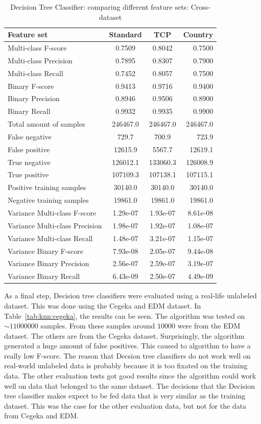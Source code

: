 \begin{table}[H]
\caption{Decision Tree Classifier: comparing different feature sets: Cross-dataset}
\label{tab:tree:cross}
\centering
\begin{tabular}{l c c r}
\toprule
Feature set & Standard & TCP & Country \\
\midrule
Multi-class F-score & 0.7509 & 0.8042 & 0.7500 \\
Multi-class Precision & 0.7895 & 0.8307 & 0.7900 \\
Multi-class Recall & 0.7452 & 0.8057 & 0.7500 \\
\midrule
Binary F-score & 0.9413 & 0.9716 & 0.9400 \\
Binary Precision & 0.8946 & 0.9506 & 0.8900 \\
Binary Recall & 0.9932 & 0.9935 & 0.9900 \\
\midrule
Total amount of samples & 246467.0 & 246467.0 & 246467.0 \\
False negative & 729.7  &  700.9 & 723.9 \\
False positive & 12615.9 & 5567.7 & 12619.1 \\
True negative & 126012.1 &  133060.3 & 126008.9  \\
True positive & 107109.3 & 107138.1 & 107115.1 \\
\midrule
Positive training samples & 30140.0 & 30140.0 & 30140.0\\
Negative training samples & 19861.0 & 19861.0 & 19861.0\\
\midrule
Variance Multi-class F-score & 1.29e-07 & 1.93e-07 & 8.61e-08 \\
Variance Multi-class Precision & 1.98e-07  &  1.92e-07  &  1.08e-07 \\
Variance Multi-class Recall &  1.48e-07 &  3.21e-07 &  1.15e-07  \\
\midrule
Variance Binary F-score & 7.93e-08  & 2.05e-07 & 9.44e-08   \\
Variance Binary Precision & 2.56e-07  &  2.59e-07  & 3.19e-07    \\
Variance Binary Recall & 6.43e-09 &  2.50e-07  & 4.49e-09 \\
\bottomrule
\end{tabular}
\end{table}

\noindent As a final step, Decision tree classifiers were evaluated using a real-life unlabeled dataset. This was done using the Cegeka and EDM dataset. In Table~\ref{tab:knn:cegeka}, the results can be seen. The algorithm was tested on $\sim11000000$ samples. From these samples around $10000$ were from the EDM dataset. The others are from the Cegeka dataset. Surprisingly,  the algorithm generated a huge amount of false positives. This caused to algorithm to have a really low F-score. The reason that Decsion tree classifiers do not work well on real-world unlabeled data is probably because it is too fixated on the training data. The other evaluation tests got good results since the algorithm could work well on data that belonged to the same dataset. The decisions that the Decision tree classifier makes expect to be fed data that is very similar as the training dataset. This was the case for the other evaluation data, but not for the data from Cegeka and EDM.

